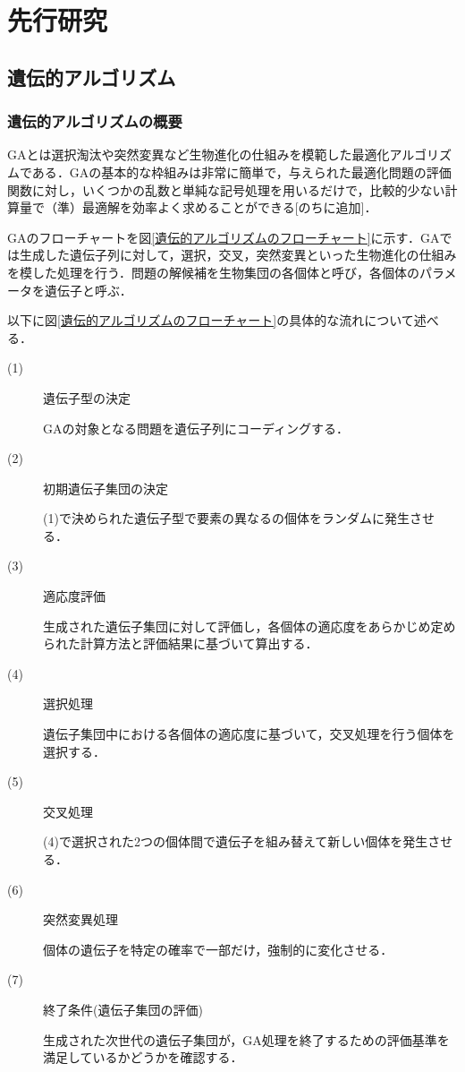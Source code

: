\chapter{先行研究}
\thispagestyle{fancy} %
\lhead{}
\chead{}
\rhead{}
\lfoot{} 
\cfoot{\thepage}  
\rfoot{}
%

\section{遺伝的アルゴリズム}
\label{sec2.1}

\subsection{遺伝的アルゴリズムの概要}
\label{sec2.1.1}

GAとは選択淘汰や突然変異など生物進化の仕組みを模範した最適化アルゴリズムである\cite{GA}．GAの基本的な枠組みは非常に簡単で，与えられた最適化問題の評価関数に対し，いくつかの乱数と単純な記号処理を用いるだけで，比較的少ない計算量で（準）最適解を効率よく求めることができる[のちに追加]．

GAのフローチャートを図\ref{遺伝的アルゴリズムのフローチャート}に示す．GAでは生成した遺伝子列に対して，選択，交叉，突然変異といった生物進化の仕組みを模した処理を行う．問題の解候補を生物集団の各個体と呼び，各個体のパラメータを遺伝子と呼ぶ．

以下に図\ref{遺伝的アルゴリズムのフローチャート}の具体的な流れについて述べる．


\begin{description}
\item[ (1) ]遺伝子型の決定

GAの対象となる問題を遺伝子列にコーディングする．

\item[ (2) ]初期遺伝子集団の決定

(1)で決められた遺伝子型で要素の異なるの個体をランダムに発生させる．

\item[ (3) ]適応度評価

生成された遺伝子集団に対して評価し，各個体の適応度をあらかじめ定められた計算方法と評価結果に基づいて算出する．

\item[ (4) ]選択処理

遺伝子集団中における各個体の適応度に基づいて，交叉処理を行う個体を選択する．

\item[ (5) ]交叉処理

(4)で選択された2つの個体間で遺伝子を組み替えて新しい個体を発生させる．

\item[ (6) ]突然変異処理

個体の遺伝子を特定の確率で一部だけ，強制的に変化させる．

\item[ (7) ]終了条件(遺伝子集団の評価)

生成された次世代の遺伝子集団が，GA処理を終了するための評価基準を満足しているかどうかを確認する．
\end{description}


